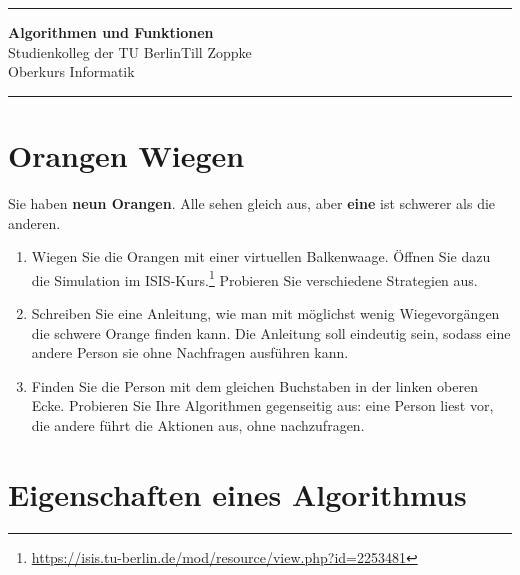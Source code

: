 \documentclass[ngerman,11pt]{article}
\date{\DTMgermanmonthname{\month} \the\year}
\begin{document}
\hrule
\begin{center}
{\large\bf Algorithmen und Funktionen}\\[-0mm]
Studienkolleg der TU Berlin\hfill Till Zoppke\\
Oberkurs Informatik \hfill \DTMgermanmonthname{\month} \the\year\\[2mm]
\end{center}
\hrule



\section*{Orangen Wiegen}
 Sie haben \textbf{neun Orangen}. Alle sehen gleich aus, aber \textbf{eine} ist schwerer als die anderen. 

\begin{enumerate}
\item Wiegen Sie die Orangen mit einer virtuellen Balkenwaage. Öffnen Sie dazu die Simulation im ISIS-Kurs.\footnote{\url{https://isis.tu-berlin.de/mod/resource/view.php?id=2253481}} Probieren Sie verschiedene Strategien aus.

\item Schreiben Sie eine Anleitung, wie man mit möglichst wenig Wiegevorgängen die schwere Orange finden kann. Die Anleitung soll eindeutig sein, sodass eine andere Person sie ohne Nachfragen ausführen kann.

\begin{tcolorbox}[colback=white, colframe=black, boxrule=0.3pt, height=7cm]
\vspace*{\fill}
\end{tcolorbox}

\item Finden Sie die Person mit dem gleichen Buchstaben in der linken oberen Ecke. Probieren Sie Ihre Algorithmen gegenseitig aus: eine Person liest vor, die andere führt die Aktionen aus, ohne nachzufragen.

\end{enumerate}



\section*{Eigenschaften eines Algorithmus}
\end{document}

